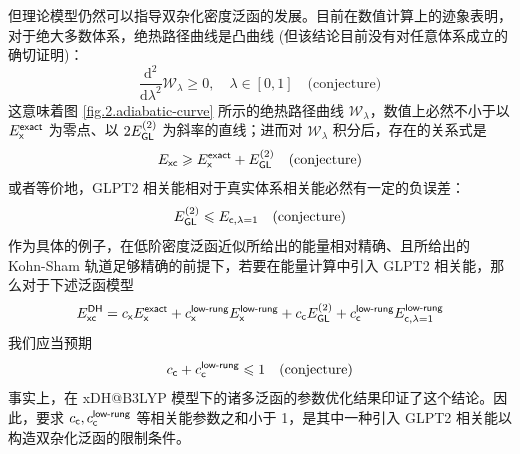 但理论模型仍然可以指导双杂化密度泛函的发展。目前在数值计算上的迹象表明，对于绝大多数体系，绝热路径曲线是凸曲线\cite{Frydel-Burke.JCP.2000, Fuchs-Burke.JCP.2005, Teale-Helgaker.JCP.2009,Teale-Helgaker.JCP.2010, Carrascal-Burke.JPCM.2015} (但该结论目前没有对任意体系成立的确切证明\cite{Crisostomo-Burke.LMP.2023})：
\begin{equation}
  \frac{\mathrm{d}^2}{\mathrm{d} \lambda^2} \mathcal{W}_{\lambda} \geqslant 0, \quad \lambda \in [0, 1] \quad \text{(conjecture)}
\end{equation}
这意味着图 \ref{fig.2.adiabatic-curve} 所示的绝热路径曲线 $\mathcal{W}_\lambda$，数值上必然不小于以 $E_{\textsf{x}}^{\textsf{exact}}$ 为零点、以 $2 E_{\textsf{GL}}^{(2)}$ 为斜率的直线；进而对 $\mathcal{W}_\lambda$ 积分后，存在的关系式是
\begin{equation}
  E_{\textsf{xc}} \geqslant E_{\textsf{x}}^{\textsf{exact}} + E_{\textsf{GL}}^{(2)} \quad \text{(conjecture)}
\end{equation}
或者等价地，GLPT2 相关能相对于真实体系相关能必然有一定的负误差：
\begin{equation}
  E_{\textsf{GL}}^{(2)} \leqslant E_{\textsf{c}, \lambda=1} \quad \text{(conjecture)}
\end{equation}
作为具体的例子，在低阶密度泛函近似所给出的能量相对精确、且所给出的 Kohn-Sham 轨道足够精确的前提下，若要在能量计算中引入 GLPT2 相关能，那么对于下述泛函模型
\begin{equation*}
  E_{\textsf{xc}}^{\textsf{DH}} = c_{\textsf{x}} E_{\textsf{x}}^{\textsf{exact}} + c_{\textsf{x}}^{\textsf{low-rung}} E_{\textsf{x}}^{\textsf{low-rung}} + c_{\textsf{c}} E_{\textsf{GL}}^{(2)} + c_{\textsf{c}}^{\textsf{low-rung}} E_{\textsf{c}, \lambda=1}^{\textsf{low-rung}}
\end{equation*}
我们应当预期
\begin{equation*}
  c_{\textsf{c}} + c_{\textsf{c}}^{\textsf{low-rung}} \leqslant 1 \quad \text{(conjecture)}
\end{equation*}
事实上，在 xDH@B3LYP 模型下的诸多泛函的参数优化结果印证了这个结论\cite{Zhang-Xu.JPCL.2021}。因此，要求 $c_{\textsf{c}}, c_{\textsf{c}}^{\textsf{low-rung}}$ 等相关能参数之和小于 1，是其中一种引入 GLPT2 相关能以构造双杂化泛函的限制条件。

